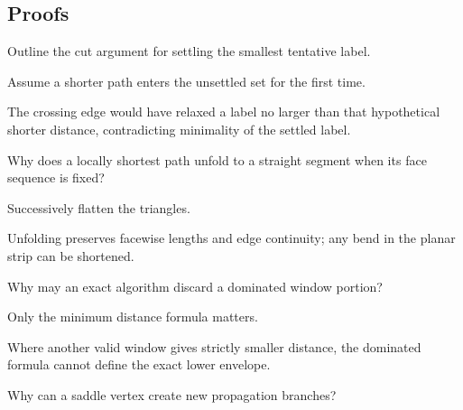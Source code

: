 \subsection*{Proofs}

\begin{exercise}\label{exr:vii39-ped-06}
Outline the cut argument for settling the smallest tentative label.
\end{exercise}

\begin{hint}
Assume a shorter path enters the unsettled set for the first time.
\end{hint}

\begin{solution}
The crossing edge would have relaxed a label no larger than that hypothetical shorter distance, contradicting minimality of the settled label.
\end{solution}

\begin{exercise}\label{exr:vii39-ped-07}
Why does a locally shortest path unfold to a straight segment when its face sequence is fixed?
\end{exercise}

\begin{hint}
Successively flatten the triangles.
\end{hint}

\begin{solution}
Unfolding preserves facewise lengths and edge continuity; any bend in the planar strip can be shortened.
\end{solution}

\begin{exercise}\label{exr:vii39-ped-08}
Why may an exact algorithm discard a dominated window portion?
\end{exercise}

\begin{hint}
Only the minimum distance formula matters.
\end{hint}

\begin{solution}
Where another valid window gives strictly smaller distance, the dominated formula cannot define the exact lower envelope.
\end{solution}

\begin{exercise}\label{exr:vii39-ped-09}
Why can a saddle vertex create new propagation branches?
\end{exercise}

